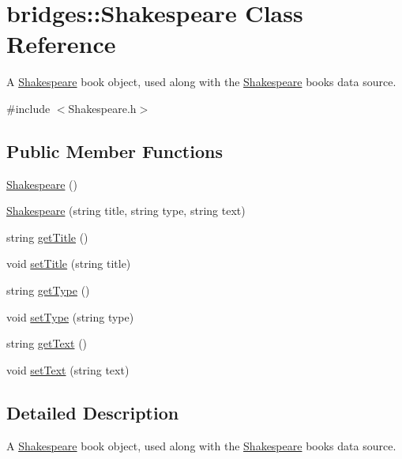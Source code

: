 \hypertarget{classbridges_1_1_shakespeare}{}\section{bridges\+:\+:Shakespeare Class Reference}
\label{classbridges_1_1_shakespeare}


A \hyperlink{classbridges_1_1_shakespeare}{Shakespeare} book object, used along with the \hyperlink{classbridges_1_1_shakespeare}{Shakespeare} books data source.  




{\ttfamily \#include $<$Shakespeare.\+h$>$}

\subsection*{Public Member Functions}
\begin{DoxyCompactItemize}
\item 
\hyperlink{classbridges_1_1_shakespeare_aa1903f3ffb483345c4053c2f315571eb}{Shakespeare} ()
\item 
\hyperlink{classbridges_1_1_shakespeare_a020cc81d13f5c17e362d467d700ac781}{Shakespeare} (string title, string type, string text)
\item 
string \hyperlink{classbridges_1_1_shakespeare_a8729b7dbdddfa4093378268ba90b01cb}{get\+Title} ()
\item 
void \hyperlink{classbridges_1_1_shakespeare_a533ff5a5dd8681ab1156c7345f85ad82}{set\+Title} (string title)
\item 
string \hyperlink{classbridges_1_1_shakespeare_a556df47f2ed9522d3f4906428af2cf7e}{get\+Type} ()
\item 
void \hyperlink{classbridges_1_1_shakespeare_a2bc1ebcfa8b28a590a1f6f83e26ce051}{set\+Type} (string type)
\item 
string \hyperlink{classbridges_1_1_shakespeare_a8f43fd74180dd3a5591840b464774b08}{get\+Text} ()
\item 
void \hyperlink{classbridges_1_1_shakespeare_a58e8cb2a96ce9af45fcf963694a3aba7}{set\+Text} (string text)
\end{DoxyCompactItemize}


\subsection{Detailed Description}
A \hyperlink{classbridges_1_1_shakespeare}{Shakespeare} book object, used along with the \hyperlink{classbridges_1_1_shakespeare}{Shakespeare} books data source. 

